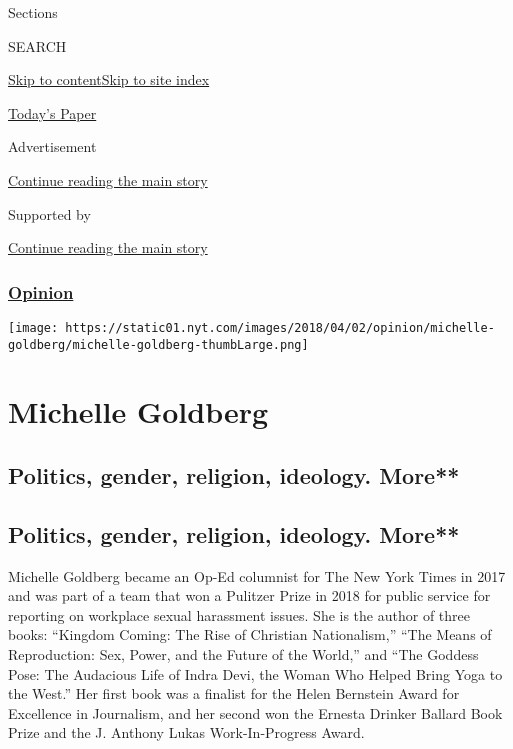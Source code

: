 Sections

SEARCH

\protect\hyperlink{site-content}{Skip to
content}\protect\hyperlink{site-index}{Skip to site index}

\href{https://myaccount.nytimes.com/auth/login?response_type=cookie\&client_id=vi}{}

\href{https://www.nytimes.com/section/todayspaper}{Today's Paper}

Advertisement

\protect\hyperlink{after-top}{Continue reading the main story}

Supported by

\protect\hyperlink{after-sponsor}{Continue reading the main story}

\hypertarget{opinion}{%
\subsubsection{\texorpdfstring{\href{/section/opinion}{Opinion}}{Opinion}}\label{opinion}}

\texttt{[image: https://static01.nyt.com/images/2018/04/02/opinion/michelle-goldberg/michelle-goldberg-thumbLarge.png]}

\hypertarget{michelle-goldberg}{%
\section{Michelle Goldberg}\label{michelle-goldberg}}

\hypertarget{politics-gender-religion-ideology-more}{%
\subsection{Politics, gender, religion, ideology.
More**}\label{politics-gender-religion-ideology-more}}

\hypertarget{politics-gender-religion-ideology-more-1}{%
\subsection{Politics, gender, religion, ideology.
More**}\label{politics-gender-religion-ideology-more-1}}

Michelle Goldberg became an Op-Ed columnist for The New York Times in
2017 and was part of a team that won a Pulitzer Prize in 2018 for public
service for reporting on workplace sexual harassment issues. She is the
author of three books: ``Kingdom Coming: The Rise of Christian
Nationalism,'' ``The Means of Reproduction: Sex, Power, and the Future
of the World,'' and ``The Goddess Pose: The Audacious Life of Indra
Devi, the Woman Who Helped Bring Yoga to the West.'' Her first book was
a finalist for the Helen Bernstein Award for Excellence in Journalism,
and her second won the Ernesta Drinker Ballard Book Prize and the J.
Anthony Lukas Work-In-Progress Award.


